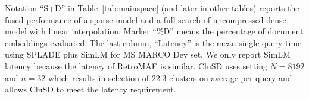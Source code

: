 Notation ``S+D'' in Table~\ref{tab:mainspace} (and later in other tables)
reports the fused performance of a sparse model and a full search of uncompressed dense model with linear interpolation.
Marker  ``\%D'' means the percentage of document embeddings  evaluated.
The last column,  ``Latency'' is the mean single-query time using SPLADE plus SimLM for MS MARCO Dev set.
We only report SimLM latency because the latency of RetroMAE is similar.
CluSD uses setting  $N=8192$ and 
$n=32$ 
which results in  selection of 22.3 clusters on average per query
and allows CluSD to meet  the latency requirement.





